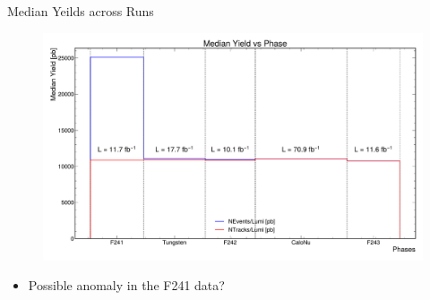 \begin{frame}{Median Yeilds across Runs}
	\begin{figure}
		\includegraphics[width=\linewidth]{./RunwisePlots/MedianYieldsPhase.pdf}
	\end{figure}
	\vspace{-0.5cm}
	\begin{itemize}
		\item Possible anomaly in the F241 data?
	\end{itemize}
\end{frame}


